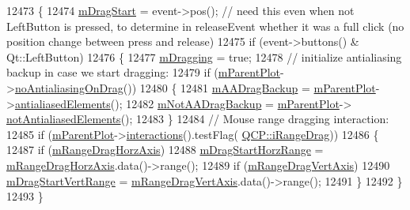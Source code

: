 \begin{DoxyCode}
12473 \{
12474   \hyperlink{class_q_c_p_axis_rect_a032896b28f83a58010d8d533b78c49df}{mDragStart} = \textcolor{keyword}{event}->pos(); \textcolor{comment}{// need this even when not LeftButton is pressed, to determine in
       releaseEvent whether it was a full click (no position change between press and release)}
12475   \textcolor{keywordflow}{if} (event->buttons() & Qt::LeftButton)
12476   \{
12477     \hyperlink{class_q_c_p_axis_rect_ab49a6698194cf0e9e38a1d734c0888a8}{mDragging} = \textcolor{keyword}{true};
12478     \textcolor{comment}{// initialize antialiasing backup in case we start dragging:}
12479     \textcolor{keywordflow}{if} (\hyperlink{class_q_c_p_layerable_aa2a528433e44db02b8aef23c1f9f90ed}{mParentPlot}->\hyperlink{class_q_custom_plot_ae07f2895a34d13a97a10cae4d8e17a36}{noAntialiasingOnDrag}())
12480     \{
12481       \hyperlink{class_q_c_p_axis_rect_aa4a24f76360cfebe1bcf17a77fa7521b}{mAADragBackup} = \hyperlink{class_q_c_p_layerable_aa2a528433e44db02b8aef23c1f9f90ed}{mParentPlot}->\hyperlink{class_q_custom_plot_a81e954fbb485bb44c609e5707f0067b3}{antialiasedElements}();
12482       \hyperlink{class_q_c_p_axis_rect_a6fcb12e052e276d57efbb128be31d6f5}{mNotAADragBackup} = \hyperlink{class_q_c_p_layerable_aa2a528433e44db02b8aef23c1f9f90ed}{mParentPlot}->
      \hyperlink{class_q_custom_plot_a8060cee59757213764382a78d3196189}{notAntialiasedElements}();
12483     \}
12484     \textcolor{comment}{// Mouse range dragging interaction:}
12485     \textcolor{keywordflow}{if} (\hyperlink{class_q_c_p_layerable_aa2a528433e44db02b8aef23c1f9f90ed}{mParentPlot}->\hyperlink{class_q_custom_plot_a12401c02b6949a717f5749bb28c62983}{interactions}().testFlag(
      \hyperlink{namespace_q_c_p_a2ad6bb6281c7c2d593d4277b44c2b037a2c4432b9aceafb94000be8d1b589ef18}{QCP::iRangeDrag}))
12486     \{
12487       \textcolor{keywordflow}{if} (\hyperlink{class_q_c_p_axis_rect_aeaaa38c6d2030dd5f84461e2596e41e3}{mRangeDragHorzAxis})
12488         \hyperlink{class_q_c_p_axis_rect_a41936cf473ec638bec382f5a40cdb1f3}{mDragStartHorzRange} = \hyperlink{class_q_c_p_axis_rect_aeaaa38c6d2030dd5f84461e2596e41e3}{mRangeDragHorzAxis}.data()->range();
12489       \textcolor{keywordflow}{if} (\hyperlink{class_q_c_p_axis_rect_a3e41dffec18987366f2a8ffd80689c12}{mRangeDragVertAxis})
12490         \hyperlink{class_q_c_p_axis_rect_a1a5ae4c74b8bd46baf91bf4e4f4165f0}{mDragStartVertRange} = \hyperlink{class_q_c_p_axis_rect_a3e41dffec18987366f2a8ffd80689c12}{mRangeDragVertAxis}.data()->range();
12491     \}
12492   \}
12493 \}
\end{DoxyCode}


